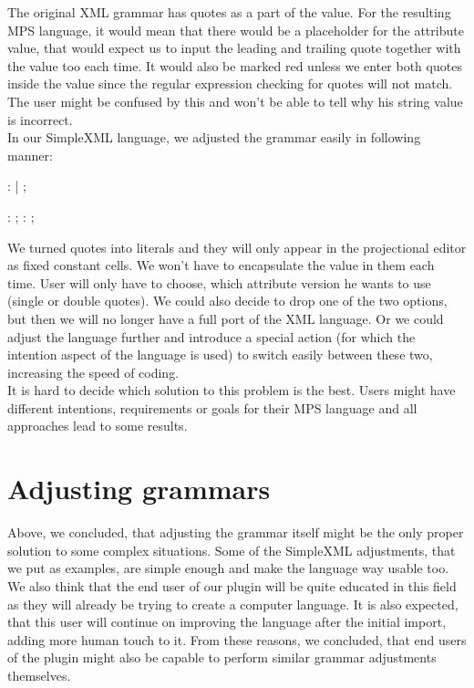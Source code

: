 The original XML grammar has quotes as a part of the value.
For the resulting MPS language, it would mean that there would be a placeholder for the attribute value, that would expect us to input the leading and trailing quote together with the value too each time.
It would also be marked red unless we enter both quotes inside the value since the regular expression checking for quotes will not match.
The user might be confused by this and won't be able to tell why his string value is incorrect.
\\

In our SimpleXML language, we adjusted the grammar easily in following manner:

\begin{antlr}
	   :      
	            |      
	            ;

	       :   \regex{~["]*} ;
	       :   \regex{~[']*} ;
\end{antlr}

We turned quotes into literals and they will only appear in the projectional editor as fixed constant cells.
We won't have to encapsulate the value in them each time.
User will only have to choose, which attribute version he wants to use (single or double quotes).
We could also decide to drop one of the two options, but then we will no longer have a full port of the XML language.
Or we could adjust the language further and introduce a special action (for which the intention aspect of the language is used) to switch easily between these two, increasing the speed of coding.
\\

It is hard to decide which solution to this problem is the best.
Users might have different intentions, requirements or goals for their MPS language and all approaches lead to some results.

\section{Adjusting grammars}
Above, we concluded, that adjusting the grammar itself might be the only proper solution to some complex situations.
Some of the SimpleXML adjustments, that we put as examples, are simple enough and make the language way usable too.
We also think that the end user of our plugin will be quite educated in this field as they will already be trying to create a computer language.
It is also expected, that this user will continue on improving the language after the initial import, adding more human touch to it.
From these reasons, we concluded, that end users of the plugin might also be capable to perform similar grammar adjustments themselves.

